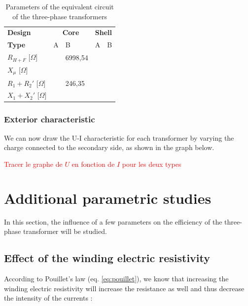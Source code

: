 \documentclass[12pt,a4paper]{report}
\begin{document}
\begin{table}[h]
    \centering
\begin{tabular}{l|ll|ll}
\textbf{Design}                            & \multicolumn{2}{c|}{\textbf{Core}} & \multicolumn{2}{c}{\textbf{Shell}} \\
\textbf{Type}      &     A & B & A & B\\
$R_{H+F}$ [$\Omega$] & & 6998,54 & & \\
$X_\mu$ [$\Omega$] & & & & \\
$R_1 + R_2'$ [$\Omega$] & & 246,35 & & \\
$X_1 + X_2'$ [$\Omega$] & & & & \\
           

\end{tabular}
    \caption{Parameters of the equivalent circuit of the three-phase transformers}
    \label{tab:equivalent_parameters}
\end{table}

\subsubsection{Exterior characteristic}
We can now draw the U-I characteristic for each transformer by varying the charge connected to the secondary side, as shown in the graph below.

\textcolor{red}{Tracer le graphe de $U$ en fonction de $I$ pour les deux types}

\section{Additional parametric studies}

In this section, the influence of a few parameters on the efficiency of the three-phase transformer will be studied.

\subsection{Effect of the winding electric resistivity}
According to Pouillet's law (eq. \ref{eq:pouillet}), we know that increasing the winding electric resistivity will increase the resistance as well and thus decrease the intensity of the currents :
\end{document}

